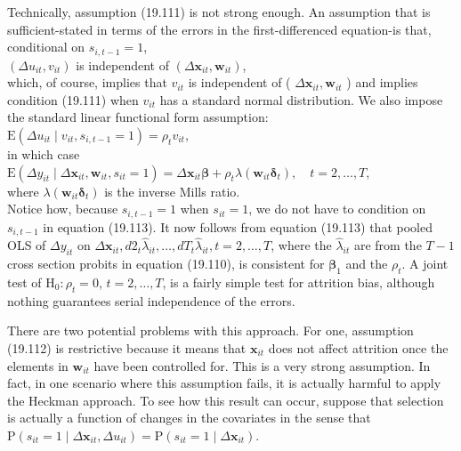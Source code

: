 \documentclass[10pt]{article}
\begin{document}
Technically, assumption (19.111) is not strong enough. An assumption that is sufficient-stated in terms of the errors in the first-differenced equation-is that, conditional on $s_{i, t-1}=1$,\\
$\left(\Delta u_{i t}, v_{i t}\right)$ is independent of $\left(\Delta \mathbf{x}_{i t}, \mathbf{w}_{i t}\right)$,\\
which, of course, implies that $v_{i t}$ is independent of ( $\Delta \mathbf{x}_{i t}, \mathbf{w}_{i t}$ ) and implies condition (19.111) when $v_{i t}$ has a standard normal distribution. We also impose the standard linear functional form assumption:\\
$\mathrm{E}\left(\Delta u_{i t} \mid v_{i t}, s_{i, t-1}=1\right)=\rho_{t} v_{i t}$,\\
in which case\\
$\mathrm{E}\left(\Delta y_{i t} \mid \Delta \mathbf{x}_{i t}, \mathbf{w}_{i t}, s_{i t}=1\right)=\Delta \mathbf{x}_{i t} \boldsymbol{\beta}+\rho_{t} \lambda\left(\mathbf{w}_{i t} \boldsymbol{\delta}_{t}\right), \quad t=2, \ldots, T$,\\
where $\lambda\left(\mathbf{w}_{i t} \boldsymbol{\delta}_{t}\right)$ is the inverse Mills ratio.\\
Notice how, because $s_{i, t-1}=1$ when $s_{i t}=1$, we do not have to condition on $s_{i, t-1}$ in equation (19.113). It now follows from equation (19.113) that pooled OLS of $\Delta y_{i t}$ on $\Delta \mathbf{x}_{i t}, d 2_{t} \hat{\lambda}_{i t}, \ldots, d T_{t} \hat{\lambda}_{i t}, t=2, \ldots, T$, where the $\hat{\lambda}_{i t}$ are from the $T-1$ cross section probits in equation (19.110), is consistent for $\boldsymbol{\beta}_{1}$ and the $\rho_{t}$. A joint test of $\mathrm{H}_{0}: \rho_{t}=0$, $t=2, \ldots, T$, is a fairly simple test for attrition bias, although nothing guarantees serial independence of the errors.

There are two potential problems with this approach. For one, assumption (19.112) is restrictive because it means that $\mathbf{x}_{i t}$ does not affect attrition once the elements in $\mathbf{w}_{i t}$ have been controlled for. This is a very strong assumption. In fact, in one scenario where this assumption fails, it is actually harmful to apply the Heckman approach. To see how this result can occur, suppose that selection is actually a function of changes in the covariates in the sense that\\
$\mathrm{P}\left(s_{i t}=1 \mid \Delta \mathbf{x}_{i t}, \Delta u_{i t}\right)=\mathrm{P}\left(s_{i t}=1 \mid \Delta \mathbf{x}_{i t}\right)$.
\end{document}
